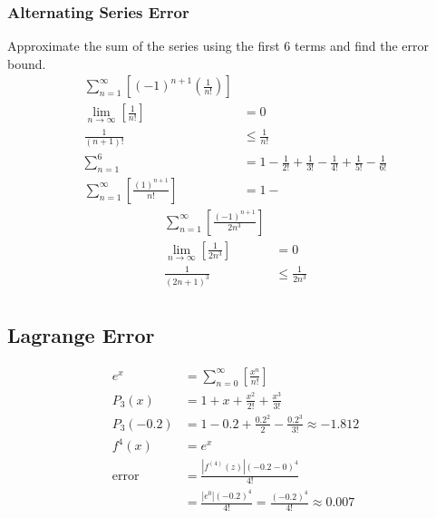 \documentclass[12pt, A4]{article}
\begin{document}
			\subsubsection*{Alternating Series Error}
				Approximate the sum of the series using the first 6 terms and find the error bound.
				\begin{align*}
					\sum_{n = 1}^\infty\left[(-1)^{n + 1}\left(\frac{1}{n!}\right)\right] \\
					\lim_{n\to\infty}\left[\frac{1}{n!}\right] &= 0 \\
					\frac{1}{(n + 1)!} &\le \frac{1}{n!} \\
					\sum_{n = 1}^6 &= 1 - \frac{1}{2!} + \frac{1}{3!} - \frac{1}{4!} + \frac{1}{5!} - \frac{1}{6!} \\
					\sum_{n = 1}^\infty\left[\frac{(1)^{n + 1}}{n!}\right] &= 1 - 
				\end{align*}
				\begin{align*}
					\sum_{n = 1}^\infty\left[\frac{(-1)^{n + 1}}{2n^3}\right] \\
					\lim_{n\to\infty}\left[\frac{1}{2n^3}\right] &= 0 \\
					\frac{1}{(2n + 1)^3} &\le \frac{1}{2n^3} \\
				\end{align*}
			\subsection*{Lagrange Error}
				\begin{align*}
					e^x &= \sum_{n = 0}^\infty\left[\frac{x^n}{n!}\right] \\
					P_3(x) &= 1 + x + \frac{x^2}{2!} + \frac{x^3}{3!} \\
					P_3(-0.2) &= 1 - 0.2 + \frac{0.2^2}{2} - \frac{0.2^3}{3!} \approx -1.812 \\
					f^{4}(x) &= e^x \\
					\mathrm{error} &= \frac{|f^{(4)}(z)|(-0.2 - 0)^4}{4!} \\
						&= \frac{\left|e^0\right|(-0.2)^4}{4!} = \frac{(-0.2)^4}{4!} \approx 0.007
				\end{align*}
\end{document}
